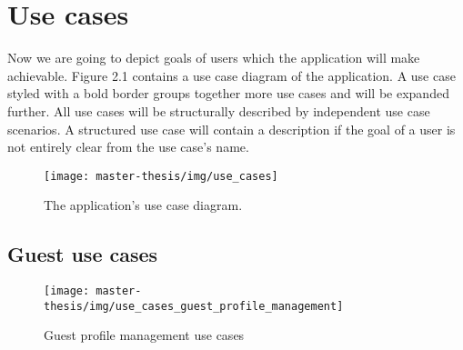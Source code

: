 \section{Use cases}
Now we are going to depict goals of users which the application will make achievable.
Figure 2.1 contains a use case diagram of the application.
A use case styled with a bold border groups together more use cases and will be expanded further.
All use cases will be structurally described by independent use case scenarios.
A structured use case will contain a description if the goal of a user is not entirely clear from the use case's name.

\begin{figure}[h]
  \texttt{[image: master-thesis/img/use\_cases]}
  \caption{The application's use case diagram.}
\end{figure}

\vspace*{\fill}

\def\arraystretch{1.5}

\subsection{Guest use cases}

\begin{figure}[h]
  \centering
  \texttt{[image: master-thesis/img/use\_cases\_guest\_profile\_management]}
  \caption{Guest profile management use cases}
\end{figure}


